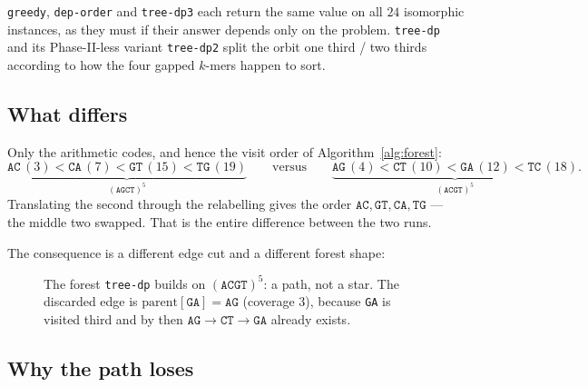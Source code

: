 \documentclass[11pt,a4paper]{article}
\theoremstyle{definition}
\theoremstyle{plain}
\theoremstyle{remark}
\begin{document}
\texttt{greedy}, \texttt{dep-order} and \texttt{tree-dp3} each return the
same value on all $24$ isomorphic instances, as they must if their
answer depends only on the problem. \texttt{tree-dp} and its
Phase-II-less variant \texttt{tree-dp2} split the orbit one third /
two thirds according to how the four gapped $k$-mers happen to sort.

\subsection{What differs}

Only the arithmetic codes, and hence the visit order of
Algorithm~\ref{alg:forest}:
\[
  \underbrace{\mathtt{AC}\,(3) <
  \mathtt{CA}\,(7) < \mathtt{GT}\,(15) < \mathtt{TG}\,(19)}_{(\mathtt{AGCT})^5}
  \qquad\text{versus}\qquad
  \underbrace{\mathtt{AG}\,(4) < \mathtt{CT}\,(10) <
  \mathtt{GA}\,(12) < \mathtt{TC}\,(18)}_{(\mathtt{ACGT})^5} .
\]
Translating the second through the relabelling gives the order
$\mathtt{AC}, \mathtt{GT}, \mathtt{CA}, \mathtt{TG}$ --- the middle two
swapped. That is the entire difference between the two runs.

The consequence is a different edge cut and a different forest shape:

\begin{figure}[h]
\centering
{}
\caption{The forest \texttt{tree-dp} builds on $(\mathtt{ACGT})^5$: a
  path, not a star. The discarded edge is
  $\mathrm{parent}[\mathtt{GA}] = \mathtt{AG}$ (coverage $3$), because
  \texttt{GA} is visited third and by then
  $\mathtt{AG} \to \mathtt{CT} \to \mathtt{GA}$ already exists.}
\label{fig:twinforest}
\end{figure}

\subsection{Why the path loses}
\end{document}
